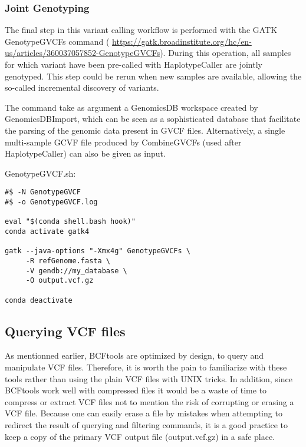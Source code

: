 \subsubsection{Joint Genotyping}

The final step in this variant calling workflow is performed with the GATK GenotypeGVCFs command (  \href{https://gatk.broadinstitute.org/hc/en-us/articles/360037057852-GenotypeGVCFs}{https://gatk.broadinstitute.org/hc/en-us/articles/360037057852-GenotypeGVCFs}). During this operation, all samples for which variant have been pre-called with HaplotypeCaller are jointly genotyped. This step could be rerun when new samples are available, allowing the so-called incremental discovery of variants.


The command take as argument a GenomicsDB workspace created by GenomicsDBImport, which can be seen as a sophisticated database that facilitate the parsing of the genomic data present in GVCF files. Alternatively, a single multi-sample GCVF file produced by CombineGVCFs (used after HaplotypeCaller) can also be given as input.



\noindent GenotypeGVCF.sh:
\begin{verbatim}
#$ -N GenotypeGVCF
#$ -o GenotypeGVCF.log

eval "$(conda shell.bash hook)"
conda activate gatk4

gatk --java-options "-Xmx4g" GenotypeGVCFs \
	 -R refGenome.fasta \
	 -V gendb://my_database \
	 -O output.vcf.gz

conda deactivate
\end{verbatim}




\subsection{Querying VCF files}


As mentionned earlier, BCFtools are optimized by design, to query and manipulate VCF files. Therefore, it is worth the pain to familiarize with these tools rather than using the plain VCF files with UNIX tricks. In addition, since BCFtools work well with compressed files it would be a waste of time to compress or extract VCF files not to mention the risk of corrupting or erasing a VCF file. Because one can easily erase a file by mistakes when attempting to redirect the result of querying and filtering commands, it is a good practice to keep a copy of the primary VCF output file (output.vcf.gz) in a safe place.

